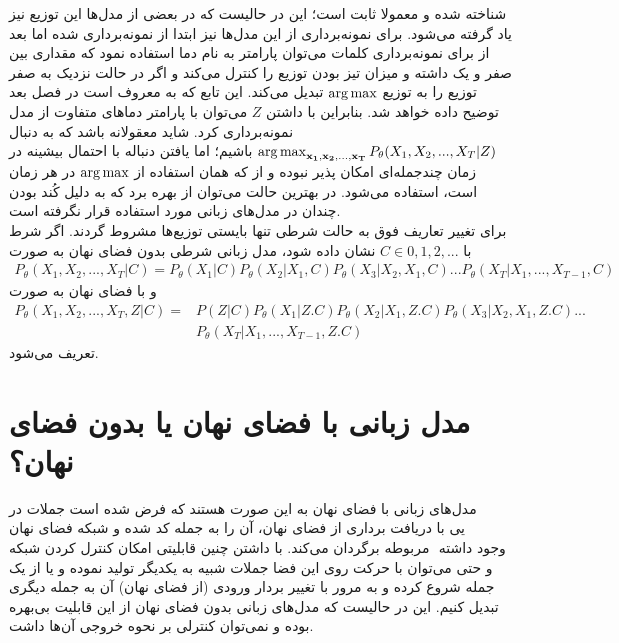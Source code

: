شناخته شده و معمولا ثابت است؛ این در حالیست که در بعضی از مدل‌ها این توزیع نیز یاد گرفته می‌شود. برای نمونه‌برداری از این مدل‌ها نیز ابتدا از \priordist{} نمونه‌برداری شده اما بعد از برای نمونه‌برداری کلمات می‌توان پارامتر به نام دما استفاده نمود که مقداری بین صفر و یک داشته و میزان تیز بودن توزیع را کنترل می‌کند و اگر در حالت نزدیک به صفر توزیع را به توزیع $\operatorname*{arg\,max}$ تبدیل می‌کند. این تابع که به  معروف است در فصل بعد توضیح داده خواهد شد. بنابراین با داشتن $Z$ می‌توان با پارامتر دما‌های متفاوت از مدل نمونه‌برداری کرد. شاید معقولانه باشد که به دنبال 
$\operatorname*{arg\,max}_{{\bf x_1}, {\bf x_2}, ..., {\bf x_T}} P_\theta(X_1, X_2, ... , X_T|Z)$
باشیم؛ اما یافتن دنباله با احتمال بیشینه در زمان چندجمله‌ای امکان پذیر نبوده و از \greedydecoding{} که همان استفاده از $\operatorname*{arg\,max}$ در هر زمان است، استفاده می‌شود. در بهترین حالت می‌توان از 
بهره برد که به دلیل کُند بودن چندان در مدل‌های زبانی مورد استفاده قرار نگرفته است.
\\
برای تغییر تعاریف فوق به حالت شرطی تنها بایستی توزیع‌ها مشروط گردند. اگر شرط با $C \in {0,1,2,...}$ نشان داده شود، مدل زبانی شرطی بدون فضای نهان به صورت 
\begin{align}
    P_\theta(X_1, X_2, ... , X_T|C) = P_\theta(X_1|C) P_\theta(X_2|X_1,C) P_\theta(X_3|X_2, X_1,C) ... P_\theta(X_T|X_1, ..., X_{T-1},C)
\end{align}
و با فضای نهان به صورت 
\begin{align}
P_\theta(X_1, X_2, ... , X_T,Z|C) =&P(Z|C) P_\theta(X_1|Z.C) P_\theta(X_2|X_1,Z.C) P_\theta(X_3|X_2, X_1,Z.C) ... \nonumber\\& P_\theta(X_T|X_1, ..., X_{T-1},Z.C)
\end{align}
تعریف می‌شود.
\section{مدل زبانی با فضای نهان یا بدون فضای نهان؟}
مدل‌های زبانی با فضای نهان به این صورت هستند که فرض شده است جملات در فضای نهان ‎کد شده و شبکه ‎\decoder یی با دریافت برداری از فضای نهان، آن را به جمله مربوطه برگردان می‌کند. با داشتن چنین قابلیتی امکان کنترل کردن شبکه ‎\decoder{}‎ وجود داشته و حتی می‌توان با حرکت روی این فضا جملات شبیه به یکدیگر تولید نموده و یا از یک جمله شروع کرده و به مرور با تغییر بردار ورودی (از فضای نهان) آن به جمله دیگری تبدیل کنیم. این در حالیست که مدل‌های زبانی بدون فضای نهان از این قابلیت بی‌بهره بوده و نمی‌توان کنترلی بر نحوه خروجی آن‌ها داشت.

